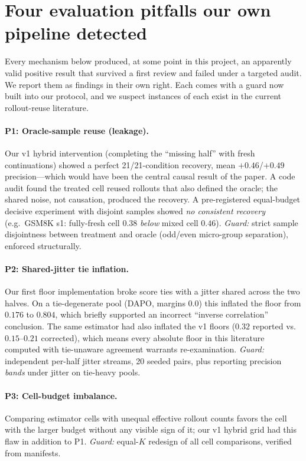 \documentclass[11pt]{article}
\begin{document}
\section{Four evaluation pitfalls our own pipeline detected}
\label{sec:pitfalls}

Every mechanism below produced, at some point in this project, an apparently
valid positive result that survived a first review and failed under a
targeted audit. We report them as findings in their own right. Each comes
with a guard now built into our protocol, and we suspect instances of each
exist in the current rollout-reuse literature.

\paragraph{P1: Oracle-sample reuse (leakage).} Our v1 hybrid intervention
(completing the ``missing half'' with fresh continuations) showed a perfect
21/21-condition recovery, mean $+0.46$/$+0.49$ precision---which would have
been the central causal result of the paper. A code audit found the treated cell reused rollouts that also
defined the oracle; the shared noise, not causation, produced the recovery. A
pre-registered equal-budget decisive experiment with disjoint samples showed
\emph{no consistent recovery} (e.g.\ GSM8K s1: fully-fresh cell $0.38$ \emph{below}
mixed cell $0.46$). \emph{Guard:} strict sample disjointness between treatment
and oracle (odd/even micro-group separation), enforced structurally.

\paragraph{P2: Shared-jitter tie inflation.} Our first floor implementation
broke score ties with a jitter shared across the two halves. On a
tie-degenerate pool (DAPO, margins $0.0$) this inflated the floor from
$0.176$ to $0.804$, which briefly supported an incorrect ``inverse
correlation'' conclusion. The same estimator had also inflated the v1 floors
($0.32$ reported vs.\ $0.15$--$0.21$ corrected), which means every
absolute floor in this literature computed with tie-unaware agreement warrants
re-examination. \emph{Guard:} independent per-half jitter streams, 20 seeded pairs,
plus reporting precision \emph{bands} under jitter on tie-heavy pools.

\paragraph{P3: Cell-budget imbalance.} Comparing estimator cells with unequal
effective rollout counts favors the cell with the larger budget without any
visible sign of it; our v1 hybrid grid had this flaw in addition to P1. \emph{Guard:} equal-$K$ redesign of all cell
comparisons, verified from manifests.
\end{document}
